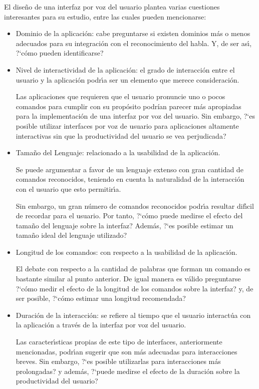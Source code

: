 El dise\~no de una interfaz por voz del usuario plantea varias cuestiones interesantes para
su estudio, entre las cuales pueden mencionarse:

\begin{itemize}
	\item Dominio de la aplicaci\'on: cabe preguntarse si existen dominios m\'as o menos adecuados para su
	integraci\'on con el reconocimiento del habla. Y, de ser as{\'\i}, {?`}c\'omo pueden identificarse?
	\item Nivel de interactividad de la aplicaci\'on: el grado de interacci\'on entre el usuario y
	la aplicaci\'on podr{\'\i}a ser un elemento que merece consideraci\'on.
	
	Las aplicaciones que requieren que el usuario pronuncie uno o pocos comandos para cumplir con su
	prop\'osito podr\'ian parecer m\'as apropiadas para la implementaci\'on de una interfaz por voz del usuario.
	Sin embargo, {?`}es posible utilizar interfaces por voz de usuario para aplicaciones altamente
	interactivas sin que la productividad del usuario se vea perjudicada?

	\item Tama\~no del Lenguaje: relacionado a la usabilidad de la aplicaci\'on.

	Se puede argumentar a favor de un lenguaje extenso con gran cantidad de comandos reconocidos, 
	teniendo en cuenta la naturalidad de la interacci\'on con el usuario que esto permitir{\'\i}a.

	Sin embargo, un gran n\'umero de comandos reconocidos podr{\'\i}a resultar dif{\'\i}cil de recordar para
	el usuario. Por tanto, {?`}c\'omo puede medirse el efecto del tama\~no del lenguaje sobre la interfaz? 
	Adem\'as, {?`}es posible estimar un tama\~no ideal del lenguaje utilizado?

	\item Longitud de los comandos: con respecto a la usabilidad de la aplicaci\'on.

	El debate con respecto a la cantidad de palabras que forman un comando es bastante similar
	al punto anterior. De igual manera es v\'alido preguntarse {?`}c\'omo medir el efecto de la longitud
	de los comandos sobre la interfaz? y, de ser posible, {?`}c\'omo estimar una longitud recomendada?

	\item Duraci\'on de la interacci\'on: se refiere al tiempo que el usuario interact\'ua con la aplicaci\'on
	a trav\'es de la interfaz por voz del usuario.

	Las caracter{\'\i}sticas propias de este tipo de interfaces, anteriormente mencionadas, podr{\'\i}an sugerir
	que son m\'as adecuadas para interacciones breves. Sin embargo, {?`}es posible utilizarlas para 
	interacciones m\'as prolongadas? y adem\'as, {?`}puede medirse el efecto de la duraci\'on sobre la
	productividad del usuario? 

\end{itemize}


